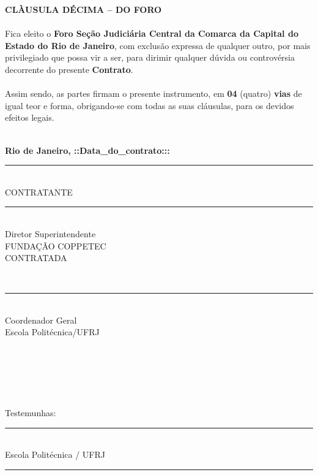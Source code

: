 \documentclass[a4paper,7.5pt]{article}
\begin{document}
{\bf CLÀUSULA DÉCIMA – DO FORO}
\\\\
\indent Fica eleito o {\bf Foro Seção Judiciária Central da Comarca da Capital do Estado do Rio de Janeiro}, com exclusão expressa de qualquer outro, por mais privilegiado que possa vir a ser, para dirimir qualquer dúvida ou controvérsia decorrente do presente {\bf Contrato}.
\\\\
\indent Assim sendo, as partes firmam o presente instrumento, em {\bf 04} (quatro) {\bf vias} de igual teor e forma, obrigando-se com todas as suas cláusulas, para os devidos efeitos legais.
\\\\
\begin{flushright}
	{\bf Rio de Janeiro, ::Data\_do\_contrato:::}
\end{flushright}
\noindent
\parbox{7.5cm}{    	
	\fontsize{7.5}{9}\selectfont
	\vspace{-0.2cm}
	\hrule
	\\
	CONTRATANTE
}
\indent\indent\indent\indent
\parbox{7.5cm}{    	
	\fontsize{7.5}{9}\selectfont
	\vspace{0.5cm}
	\hrule
	\\
	Diretor Superintendente
	\\
	FUNDAÇÃO COPPETEC
	\\
	CONTRATADA
}
\\
\parbox{7.5cm}{    	
	\fontsize{7.5}{9}\selectfont
	\vspace{0.5cm}
	\hrule
	\\
	Coordenador Geral
	\\
	Escola Politécnica/UFRJ
}
\\\\\\\\\\
Testemunhas:
\\
\parbox{7.5cm}{    	
	\fontsize{7.5}{9}\selectfont
	\vspace{1.7cm}
	\hrule
	\\
	Escola Politécnica / UFRJ	
}
\indent\indent\indent\indent
\parbox{7.5cm}{    	
	\fontsize{7.5}{11}\selectfont
	\vspace{1.5cm}
	\hrule
}
\end{document}
